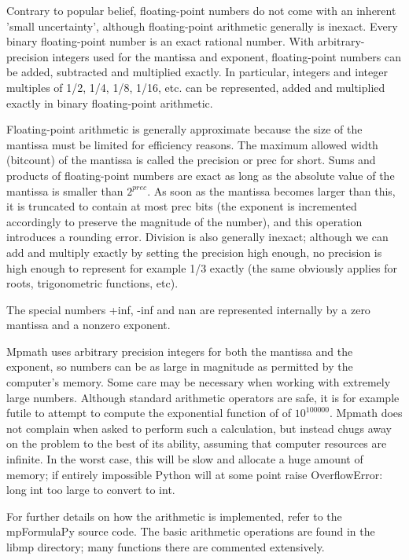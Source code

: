 \vpara
Contrary to popular belief, floating-point numbers do not come with an inherent 'small uncertainty', although floating-point arithmetic generally is inexact. Every binary floating-point number is an exact rational number. With arbitrary-precision integers used for the mantissa and exponent, floating-point numbers can be added, subtracted and multiplied exactly. In particular, integers and integer multiples of 1/2, 1/4, 1/8, 1/16, etc. can be represented, added and multiplied exactly in binary floating-point arithmetic.

\vpara
Floating-point arithmetic is generally approximate because the size of the mantissa must be limited for efficiency reasons. The maximum allowed width (bitcount) of the mantissa is called the precision or prec for short. Sums and products of floating-point numbers are exact
as long as the absolute value of the mantissa is smaller than $2^{prec}$. As soon as the mantissa becomes larger than this, it is truncated to contain at most prec bits (the exponent is incremented accordingly to preserve the magnitude of the number), and this operation introduces a rounding error. Division is also generally inexact; although we can add and
multiply exactly by setting the precision high enough, no precision is high enough to represent for example 1/3 exactly (the same obviously applies for roots, trigonometric functions, etc).

\vpara
The special numbers +inf, -inf and nan are represented internally by a zero mantissa and a nonzero exponent.

\vpara
Mpmath uses arbitrary precision integers for both the mantissa and the exponent, so numbers can be as large in magnitude as permitted by the computer's memory. Some care may be necessary when working with extremely large numbers. Although standard arithmetic operators are safe, it is for example futile to attempt to compute the exponential
function of of $10^{100000}$. Mpmath does not complain when asked to perform such a calculation, but instead chugs away on the problem to the best of its ability, assuming that computer resources are infinite. In the worst case, this will be slow and allocate a huge amount of memory; if entirely impossible Python will at some point raise OverflowError: long int too large to convert to int.

\vpara
For further details on how the arithmetic is implemented, refer to the mpFormulaPy source code. The basic arithmetic operations are found in the libmp directory; many functions there are commented extensively.






